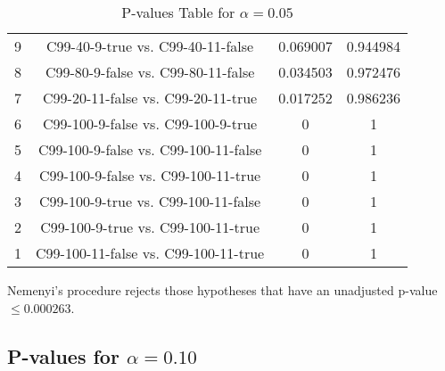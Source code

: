 \documentclass[a4paper,10pt]{article}
\begin{document}
\begin{landscape}
\begin{table}[!htp]
\begin{tabular}{cccc}
9&C99-40-9-true vs. C99-40-11-false&0.069007&0.944984\\
8&C99-80-9-false vs. C99-80-11-false&0.034503&0.972476\\
7&C99-20-11-false vs. C99-20-11-true&0.017252&0.986236\\
6&C99-100-9-false vs. C99-100-9-true&0&1\\
5&C99-100-9-false vs. C99-100-11-false&0&1\\
4&C99-100-9-false vs. C99-100-11-true&0&1\\
3&C99-100-9-true vs. C99-100-11-false&0&1\\
2&C99-100-9-true vs. C99-100-11-true&0&1\\
1&C99-100-11-false vs. C99-100-11-true&0&1\\
\hline
\end{tabular}
\caption{P-values Table for $\alpha=0.05$}
\end{table}Nemenyi's procedure rejects those hypotheses that have an unadjusted p-value $\le0.000263$.

\pagebreak

\subsection{P-values for $\alpha=0.10$}


\end{landscape}
\end{document}
